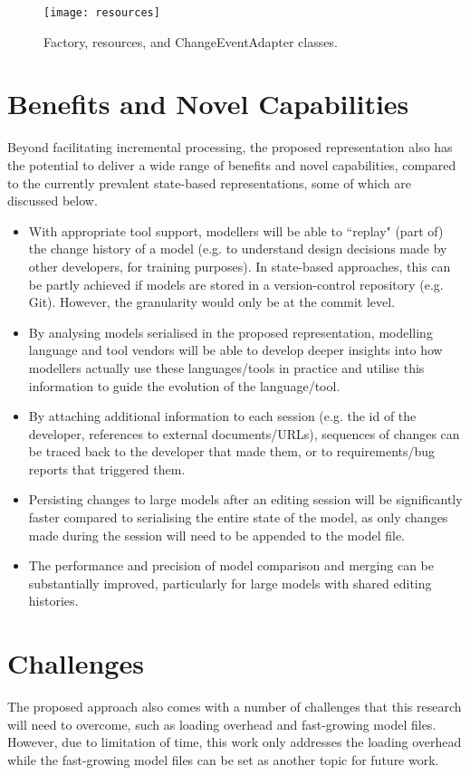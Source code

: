 \begin{figure}[th]
    \centering
    \texttt{[image: resources]}
    \caption{Factory, resources, and ChangeEventAdapter classes.}
    \label{fig:resources}
\end{figure}

\section{Benefits and Novel Capabilities}
\label{sec:benefits_and_novel_capabilities}
Beyond facilitating incremental processing, the proposed representation 
also has the potential to deliver a wide range of benefits and 
novel capabilities, compared to the currently prevalent 
state-based representations, some of which are discussed below.

\begin{itemize}
    \item With appropriate tool support, modellers will be able to ``replay" (part of) the change history of a model (e.g. to understand design decisions made by other developers, for training purposes). In state-based approaches, this can be partly achieved if models are stored in a version-control repository (e.g. Git). However, the granularity would only be at the commit level.
    \item By analysing models serialised in the proposed representation, modelling language and tool vendors will be able to develop deeper insights into how modellers actually use these languages/tools in practice and utilise this information to guide the evolution of the language/tool.
    \item By attaching additional information to each session (e.g. the id of the developer, references to external documents/URLs), sequences of changes can be traced back to the developer that made them, or to requirements/bug reports that triggered them.
    \item Persisting changes to large models after an editing session will be significantly faster compared to serialising the entire state of the model, as only changes made during the session will need to be appended to the model file.
    \item The performance and precision of model comparison and merging can be substantially improved, particularly for large models with shared editing histories.
\end{itemize}

\section{Challenges}
\label{sec:challenges}
The proposed approach also comes with a number of challenges that this research will need to overcome, such as loading overhead and fast-growing model files. However, due to limitation of time, this work only addresses the loading overhead while the fast-growing model files can be set as another topic for future work.  


